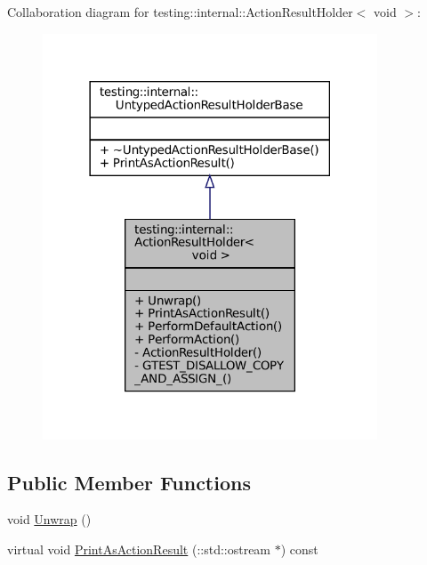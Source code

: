 Collaboration diagram for testing\+:\+:internal\+:\+:Action\+Result\+Holder$<$ void $>$\+:
\nopagebreak
\begin{figure}[H]
\begin{center}
\leavevmode
\includegraphics[width=282pt]{classtesting_1_1internal_1_1ActionResultHolder_3_01void_01_4__coll__graph}
\end{center}
\end{figure}
\subsection*{Public Member Functions}
\begin{DoxyCompactItemize}
\item 
void \hyperlink{classtesting_1_1internal_1_1ActionResultHolder_3_01void_01_4_aa57f371e1559b236e6424b2f50dcd6a2}{Unwrap} ()
\item 
virtual void \hyperlink{classtesting_1_1internal_1_1ActionResultHolder_3_01void_01_4_ab829399d5a7d6fc9f0ecde0c0a6a3aeb}{Print\+As\+Action\+Result} (\+::std\+::ostream $\ast$) const
\end{DoxyCompactItemize}
